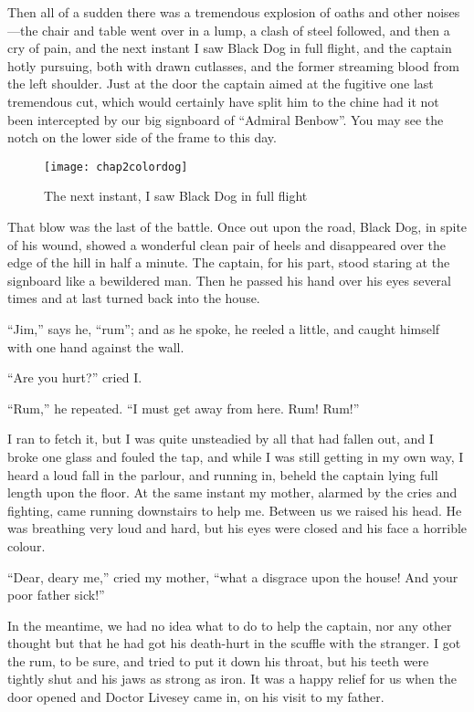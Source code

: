  

Then all of a sudden there was a tremendous explosion of oaths and other noises---the chair and table went over in a lump, a clash of steel followed, and then a cry of pain, and the next instant I saw Black Dog in full flight, and the captain hotly pursuing, both with drawn cutlasses, and the former streaming blood from the left shoulder. Just at the door the captain aimed at the fugitive one last tremendous cut, which would certainly have split him to the chine had it not been intercepted by our big signboard of \enquote{Admiral Benbow}. You may see the notch on the lower side of the frame to this day.


 \begin{figure}[p]
\centering
\texttt{[image: chap2colordog]}
\caption[\textbf{The next instant, I saw Black Dog in full flight}]{The next instant, I saw Black Dog in full flight}
\end{figure}

That blow was the last of the battle. Once out upon the road, Black Dog, in spite of his wound, showed a wonderful clean pair of heels and disappeared over the edge of the hill in half a minute. The captain, for his part, stood staring at the signboard like a bewildered man. Then he passed his hand over his eyes several times and at last turned back into the house.

\enquote{Jim,} says he, \enquote{rum}; and as he spoke, he reeled a little, and caught himself with one hand against the wall.

\enquote{Are you hurt?} cried I.

\enquote{Rum,} he repeated. \enquote{I must get away from here. Rum! Rum!}

I ran to fetch it, but I was quite unsteadied by all that had fallen out, and I broke one glass and fouled the tap, and while I was still getting in my own way, I heard a loud fall in the parlour, and running in, beheld the captain lying full length upon the floor. At the same instant my mother, alarmed by the cries and fighting, came running downstairs to help me. Between us we raised his head. He was breathing very loud and hard, but his eyes were closed and his face a horrible colour.

\enquote{Dear, deary me,} cried my mother, \enquote{what a disgrace upon the house! And your poor father sick!}

In the meantime, we had no idea what to do to help the captain, nor any other thought but that he had got his death-hurt in the scuffle with the stranger. I got the rum, to be sure, and tried to put it down his throat, but his teeth were tightly shut and his jaws as strong as iron. It was a happy relief for us when the door opened and Doctor Livesey came in, on his visit to my father.

